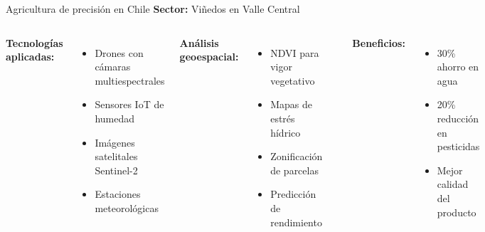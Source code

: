 \documentclass[10pt]{beamer}
\begin{document}
\begin{frame}{Agricultura de precisión en Chile}
    \textbf{Sector:} Viñedos en Valle Central
    
    \begin{columns}
        \textbf{Tecnologías aplicadas:}
        \begin{itemize}
            \item Drones con cámaras multiespectrales
            \item Sensores IoT de humedad
            \item Imágenes satelitales Sentinel-2
            \item Estaciones meteorológicas
        \end{itemize}
        
        \textbf{Análisis geoespacial:}
        \begin{itemize}
            \item NDVI para vigor vegetativo
            \item Mapas de estrés hídrico
            \item Zonificación de parcelas
            \item Predicción de rendimiento
        \end{itemize}
        
        \begin{center}
        \end{center}
        
        \textbf{Beneficios:}
        \begin{itemize}
            \item 30\% ahorro en agua
            \item 20\% reducción en pesticidas
            \item Mejor calidad del producto
        \end{itemize}
    \end{columns}
\end{frame}
\end{document}

